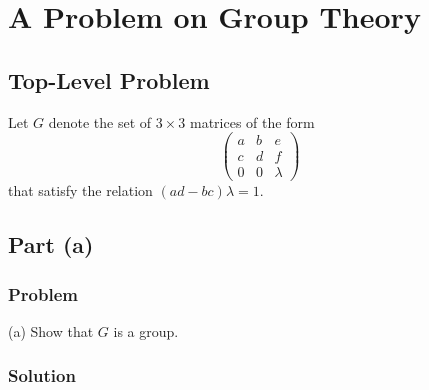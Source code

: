 \section{A Problem on Group Theory}
\subsection{Top-Level Problem}
Let $G$ denote the set of $3 \times 3$ matrices of the form 
$$
\begin{pmatrix}
    a & b & e\\
    c & d & f \\
    0 & 0 & \lambda
\end{pmatrix}
$$
that satisfy the relation $(ad - bc)\lambda = 1$.
\subsection{Part (a)}
\subsubsection{Problem}
(a) Show that $G$ is a group.
\subsubsection{Solution}

